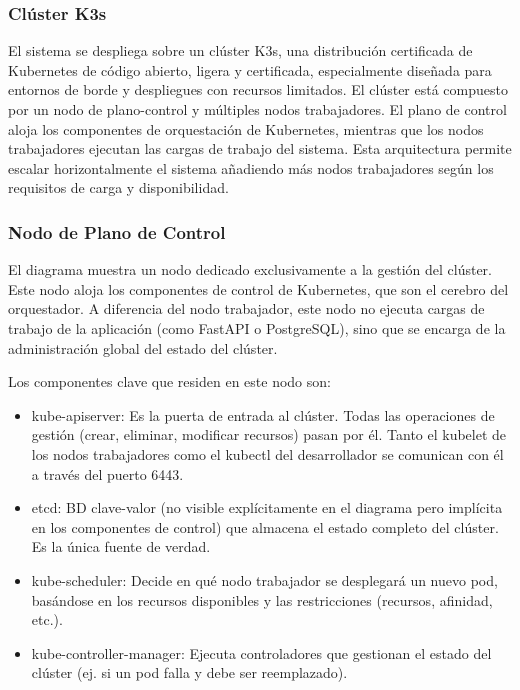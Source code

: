\subsubsection{Clúster K3s}

El sistema se despliega sobre un \gls{clúster} \gls{K3s}, una distribución certificada de Kubernetes de código abierto, 
ligera y certificada, especialmente diseñada para entornos de borde y despliegues con recursos limitados. 
El \gls{clúster} está compuesto por un \gls{nodo} de \gls{plano-control} y múltiples \gls{nodo}s trabajadores. El plano de 
control aloja los componentes de orquestación de Kubernetes, mientras que los \gls{nodo}s trabajadores ejecutan 
las cargas de trabajo del sistema. Esta arquitectura permite escalar horizontalmente el sistema añadiendo 
más \gls{nodo}s trabajadores según los requisitos de carga y disponibilidad.

\subsubsection{Nodo de Plano de Control}

El diagrama muestra un \gls{nodo} dedicado exclusivamente a la gestión del clúster. Este \gls{nodo} aloja los 
componentes de control de Kubernetes, que son el cerebro del 
orquestador. A diferencia del \gls{nodo} trabajador, este \gls{nodo} no ejecuta cargas de trabajo de la 
aplicación (como FastAPI o PostgreSQL), sino que se encarga de la administración global del 
estado del clúster.

Los componentes clave que residen en este \gls{nodo} son:

\begin{itemize}
    \item \gls{kube-apiserver}: Es la puerta de entrada al clúster. Todas las operaciones de gestión (crear, eliminar, modificar recursos) pasan por él. Tanto el \gls{kubelet} de los \gls{nodo}s trabajadores como el \gls{kubectl} del desarrollador se comunican con él a través del puerto 6443.
    \item \gls{etcd}: \ac{BD} clave-valor (no visible explícitamente en el diagrama pero implícita en los componentes de control) que almacena el estado completo del clúster. Es la única fuente de verdad.
    \item \gls{kube-scheduler}: Decide en qué \gls{nodo} trabajador se desplegará un nuevo \gls{pod}, basándose en los recursos disponibles y las restricciones (recursos, afinidad, etc.).
    \item \gls{kube-controller-manager}: Ejecuta controladores que gestionan el estado del clúster (ej. si un \gls{pod} falla y debe ser reemplazado).
\end{itemize}

